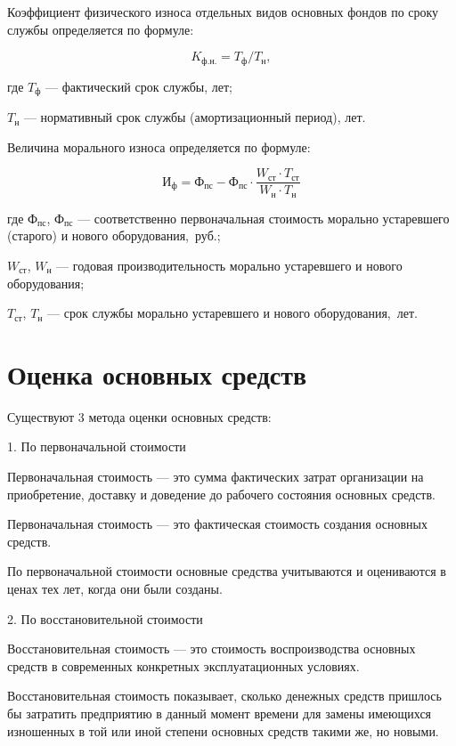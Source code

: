 Коэффициент физического износа отдельных видов основных фондов по сроку службы
определяется по формуле:

\begin{equation}
    K_{\text{ф.н.}} = T_{\text{ф}}/T_{\text{н}},
\end{equation}

где $T_{\text{ф}}$ --- фактический срок службы, лет;

$T_{\text{н}}$ --- нормативный срок службы (амортизационный период), лет.

Величина морального износа определяется по формуле:

\begin{equation}
    \text{И}_{\text{ф}} = \text{Ф}_{\text{пс}} - \text{Ф}_{\text{пс}} \cdot
    \frac{W_{\text{ст}} \cdot T_{\text{ст}}}{W_{\text{н}} \cdot T_{\text{н}}}
\end{equation}

где $\text{Ф}_{\text{пс}}$, $\text{Ф}_{\text{пс}}$ --- соответственно
первоначальная стоимость морально устаревшего (старого) и нового
оборудования,~руб.;

$W_{\text{ст}}$, $W_{\text{н}}$ --- годовая производительность морально
устаревшего и нового оборудования;

$T_{\text{ст}}$, $T_{\text{н}}$ --- срок службы морально устаревшего и нового
оборудования,~лет.

\section{Оценка основных средств}

Существуют 3 метода оценки основных средств:

1. По первоначальной стоимости

Первоначальная стоимость --- это сумма фактических затрат организации на
приобретение, доставку и доведение до рабочего состояния основных средств.

Первоначальная стоимость --- это фактическая стоимость создания основных средств.

По первоначальной стоимости основные средства учитываются и оцениваются в ценах
тех лет, когда они были созданы.

2. По восстановительной стоимости

Восстановительная стоимость --- это стоимость воспроизводства основных средств в
современных конкретных эксплуатационных условиях.

Восстановительная стоимость показывает, сколько денежных средств пришлось бы
затратить предприятию в данный момент времени для замены имеющихся изношенных в
той или иной степени основных средств такими же, но новыми.

